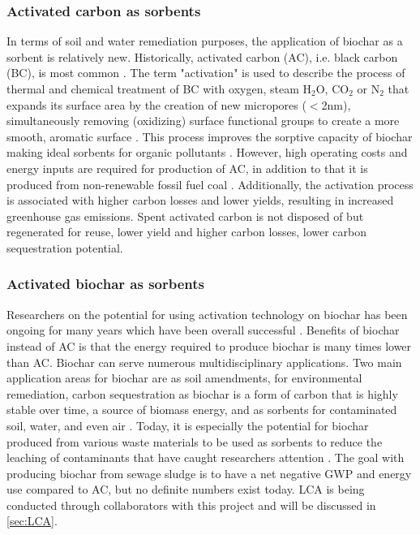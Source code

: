 \subsubsection{Activated carbon as sorbents}
In terms of soil and water remediation purposes, the application of biochar as a sorbent is relatively new. Historically, activated carbon (AC), i.e. black carbon (BC), is most common \citep{Cornelissen2005}. The term "activation" is used to describe the process of thermal and chemical treatment of BC with oxygen, steam $\mathrm{H_2O}$, $\mathrm{CO_2}$ or $\mathrm{N_2}$ that expands its surface area by the creation of new micropores ($<$2nm), simultaneously removing (oxidizing) surface functional groups to create a more smooth, aromatic surface \citep{sajjadi2019comprehensive}. This process improves the sorptive capacity of biochar making ideal sorbents for organic pollutants \citep{Ahmad2014}. However, high operating costs and energy inputs are required for production of AC, in addition to that it is produced from non-renewable fossil fuel coal \citep{Li2019}. Additionally, the activation process is associated with higher carbon losses and lower yields, resulting in increased greenhouse gas emissions.  Spent activated carbon is not disposed of but regenerated for reuse, lower yield and higher carbon losses, lower carbon sequestration potential. 

\subsubsection{Activated biochar as sorbents}
Researchers on the potential for using activation technology on biochar has been ongoing for many years which have been overall successful \citep{Sormo2021}. Benefits of biochar instead of AC is that the energy required to produce biochar is many times lower than AC.  Biochar can serve numerous multidisciplinary applications. Two main application areas for biochar are as soil amendments, for environmental remediation, carbon sequestration as biochar is a form of carbon that is highly stable over time, a source of biomass energy, and as sorbents for contaminated soil, water, and even air \citep{Ahmad2014}. Today, it is especially the potential for biochar produced from various waste materials to be used as sorbents to reduce the leaching of contaminants that have caught researchers attention \citep{Cornelissen2011Capping, Kupryianchyk2016b, Sormo2021, zhou2010sorption}. 
The goal with producing biochar from sewage sludge is to have a net negative GWP and energy use compared to AC, but no definite numbers exist today. LCA is being conducted through collaborators with this project and will be discussed in \cref{sec:LCA}. 

